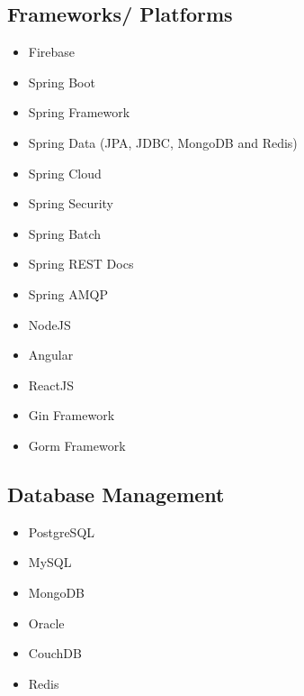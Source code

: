 \begin{cventries}
\begin{row}[cellsep=0.75cm]{3}{3}
    \begin{cell}{1}
	\section*{Frameworks/ Platforms}
	\vspace{-1.5ex}
    \begin{itemize}
        \item {Firebase}
        \item {Spring Boot}
        \item {Spring Framework}
        \item {Spring Data (JPA, JDBC, MongoDB and Redis)}
        \item {Spring Cloud}
        \item {Spring Security}
        \item {Spring Batch}
        \item {Spring REST Docs}
        \item {Spring AMQP}
        \item {NodeJS}
        \item {Angular}
        \item {ReactJS}
        \item {Gin Framework}
        \item {Gorm Framework}
    \end{itemize}
	\end{cell}
    \begin{cell}{1}
	\section*{Database Management}
	\vspace{-1.5ex}
    \begin{itemize}
        \item {PostgreSQL}
        \item {MySQL}
        \item {MongoDB}
        \item {Oracle}
        \item {CouchDB}
        \item {Redis}
    \end{itemize}
	\end{cell}
	\begin{cell}{1}

\end{cell}
\end{row}
\end{cventries}
